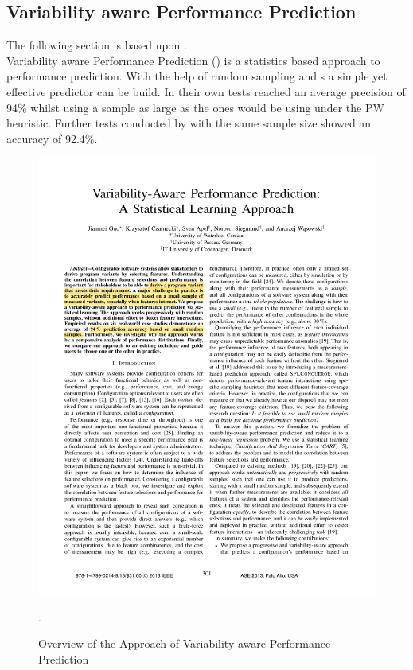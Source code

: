 \subsection{Variability aware Performance Prediction}\label{sec:VAPP}

The following section is based upon \citet{VariabilityAwarePerformancePredictionJianmeiSigmundApel}.\\
Variability aware Performance Prediction (\VAPP) is a statistics based approach to performance prediction. With the help of random sampling and \CART s a simple yet effective predictor can be build. In their own tests \citet{VariabilityAwarePerformancePredictionJianmeiSigmundApel} reached an average precision of 94\% whilst using a sample as large as the ones \AFID would be using under the PW heuristic. Further tests conducted by \citet{FasterDiscoveryofFasterSystemConfigurationsSiegmund2017} with the same sample size showed an accuracy of 92.4\%. 


\begin{figure}
	\vspace{-1\baselineskip}
	\setlength\belowcaptionskip{-\baselineskip}
	\includegraphics[page=3,clip,trim=11cm 13.5cm 1.5cm 10.25cm, width=\linewidth ]{Paper/VariabilityAwarePerformancePredictionAStatisticalLearningApproach}
	\caption{Overview of the Approach of Variability aware Performance Prediction \cite{VariabilityAwarePerformancePredictionJianmeiSigmundApel}}.
	\label{fig:VAPPOverview}
\end{figure}

